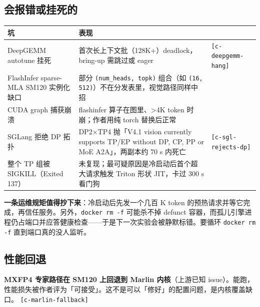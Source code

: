 \subsection{会报错或挂死的}

\begin{table}[t]
\centering
\footnotesize
\setlength{\tabcolsep}{4pt}
\label{tab:14}
\begin{tabularx}{\textwidth}{XXl}
\toprule
坑 & 表现 &  \\
\midrule
DeepGEMM autotune 挂死 & 首次长上下文批（128K+）deadlock，bring-up 需跳过或 eager & {\scriptsize\texttt{[c-\hspace{0pt}deepgemm-\hspace{0pt}hang]}} \\
FlashInfer sparse-MLA SM120 实例化缺口 & 部分 \texttt{(num\_heads,\allowbreak{} topk)} 组合（如 \texttt{(16, 512)}）不在分发表里，视觉路径同样中招 &  \\
CUDA graph 捕获崩溃 & flashinfer 算子在图里、>4K token 时崩；作者用纯 torch 替换后正常 &  \\
SGLang 拒绝 DP 拓扑 & DP2×TP4 抛「V4.1 vision currently supports TP/EP without DP, CP, PP or MoE A2A」，两副本约 70 s 内死亡 & {\scriptsize\texttt{[c-\hspace{0pt}sgl-\hspace{0pt}rejects-\hspace{0pt}dp]}} \\
整个 TP 组被 SIGKILL（Exited 137） & 未复现；最可疑原因是冷启动后首个超大请求触发 Triton 形状 JIT，卡过 300 s 看门狗 &  \\
\bottomrule
\end{tabularx}
\end{table}

\textbf{一条运维规矩值得抄下来}：冷启动后先发一个几百 K token 的预热请求并等它完成，再信任服务。另外，\texttt{docker\allowbreak{} rm\allowbreak{} -\allowbreak{}f} 可能杀不掉 defunct 容器，而孤儿引擎进程仍占端口并应答健康检查——于是下一次实验会被静默标错。要循环 \texttt{docker\allowbreak{} rm\allowbreak{} -\allowbreak{}f} 直到端口真的没人监听。


\subsection{性能回退}

\textbf{MXFP4 专家路径在 SM120 上回退到 Marlin 内核}（上游已知 issue）。能跑，性能损失被作者评为「可接受」。这不是可以「修好」的配置问题，是内核覆盖缺口。 {\scriptsize\texttt{[c-\hspace{0pt}marlin-\hspace{0pt}fallback]}}



